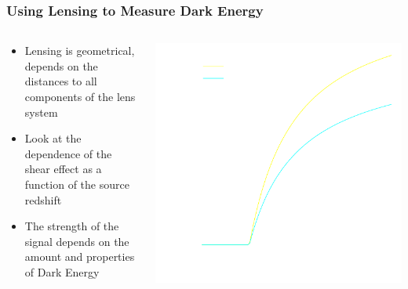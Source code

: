 \documentclass{beamer}
\begin{document}
\frame
{
    \frametitle{Using Lensing to Measure Dark Energy}

    \begin{columns}
        \begin{column}{0.5\textwidth}    
            \begin{itemize}

                \item Lensing is geometrical, depends on the distances to all
                    components of the lens system

                \item Look at the dependence of the shear effect as a function
                    of the source redshift
                    
                \item The strength of the signal depends on the amount and
                    properties of Dark Energy

            \end{itemize}
        \end{column}
        \begin{column}{0.5\textwidth}
            \begin{center}
                \includegraphics[width=\textwidth]{scinv-example-invert.pdf}
            \end{center}
        \end{column}
    \end{columns}
}
\end{document}
